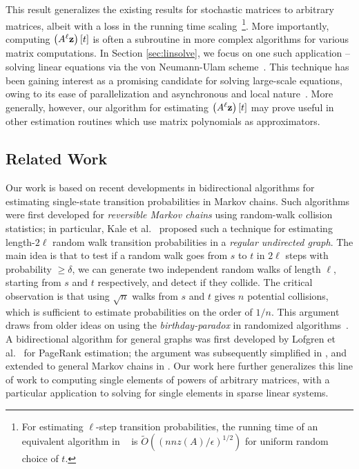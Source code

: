This result generalizes the existing results for stochastic matrices to arbitrary matrices, albeit with a loss in the running time scaling~\footnote{For estimating $\ell$-step transition probabilities, the running time of an equivalent algorithm in ~\cite{banerjee2015fast} is $\widetilde{O}\left(\left(nnz(A)/\epsilon\right)^{1/2}\right)$ for uniform random choice of $t$.}. 
More importantly, computing $\left(A^{\ell}\mathbf{z}\right)[t]$ is often a subroutine in more complex algorithms for various matrix computations.
In Section \ref{sec:linsolve}, we focus on one such application -- solving linear equations via the von Neumann-Ulam scheme~\cite{forsythe1950matrix}. 
This technique has been gaining interest as a promising candidate for solving large-scale equations, owing to its ease of parallelization and asynchronous and local nature~\cite{ji2013convergence,dimov2015new,lee2014asynchronous}. 
More generally, however, our algorithm for estimating $\left(A^{\ell}\mathbf{z}\right)[t]$ may prove useful in other estimation routines which use matrix polynomials as approximators. 


\subsection{Related Work}

Our work is based on recent developments in bidirectional algorithms for estimating single-state transition probabilities in Markov chains.
Such algorithms were first developed for \emph{reversible Markov chains} using random-walk collision statistics; in particular, Kale et al.~\cite{Kale2008} proposed such a technique for estimating length-$2\ell$ random walk transition probabilities in a \emph{regular undirected graph}.
The main idea is that to test if a random walk goes from $s$ to $t$ in $2\ell$ steps with probability $\geq\delta$, we can generate two independent random walks of length $\ell$, starting from $s$ and $t$ respectively, and detect if they collide.
The critical observation is that using $\sqrt{n}$ walks from $s$ and $t$ gives $n$ potential collisions, which is sufficient to estimate probabilities on the order of $1/n$.
This argument draws from older ideas on using the \emph{birthday-paradox} in randomized algorithms~\cite{Motwani2007}.
A bidirectional algorithm for general graphs was first developed by Lofgren et al.~\cite{Lofgren2014} for PageRank estimation; the argument was subsequently simplified in \cite{lofgren2016personalized}, and extended to general Markov chains in \cite{banerjee2015fast}. 
Our work here further generalizes this line of work to computing single elements of powers of arbitrary matrices, with a particular application to solving for single elements in sparse linear systems.

